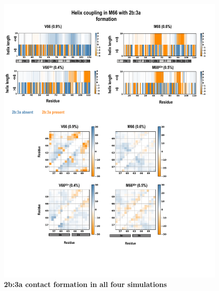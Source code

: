 \documentclass[journal=jacsat,manuscript=article]{achemso}
\begin{document}
\begin{figure}[!ht]
\includegraphics[scale=0.5,width=12cm,trim={0 0cm 0 0cm},clip]{../figures/coupling_1.pdf}
\caption{{\bf 2b:3a contact formation in all four simulations}
 }
\label{fig6}
\end{figure}
\end{document}
